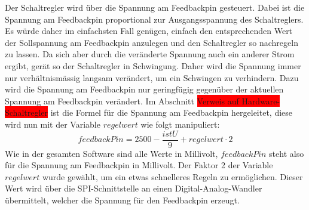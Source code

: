 Der Schaltregler wird über die Spannung am Feedbackpin gesteuert. Dabei ist die Spannung am Feedbackpin proportional zur Ausgangsspannung des Schaltreglers. Es würde daher im einfachsten Fall genügen, einfach den entsprechenden Wert der Sollspannung am Feedbackpin anzulegen und den Schaltregler so nachregeln zu lassen. Da sich aber durch die veränderte Spannung auch ein anderer Strom ergibt, gerät so der Schaltregler in Schwingung. Daher wird die Spannung immer nur verhältnismässig langsam verändert, um ein Schwingen zu verhindern. Dazu wird die Spannung am Feedbackpin nur geringfügig gegenüber der aktuellen Spannung am Feedbackpin verändert. Im Abschnitt \colorbox{red}{Verweis auf Hardware-Schaltregler} ist die Formel für die Spannung am Feedbackpin hergeleitet, diese wird nun mit der Variable $regelwert$ wie folgt manipuliert:
\begin{equation}
	feedbackPin=2500-\frac{istU}{9}+regelwert\cdot2
\label{eq:}
\end{equation}
Wie in der gesamten Software sind alle Werte in Millivolt, $feedbackPin$ steht also für die Spannung am Feedbackpin in Millivolt. Der Faktor 2 der Variable $regelwert$ wurde gewählt, um ein etwas schnelleres Regeln zu ermöglichen. Dieser Wert wird über die SPI-Schnittstelle an einen Digital-Analog-Wandler übermittelt, welcher die Spannung für den Feedbackpin erzeugt.



%
%

